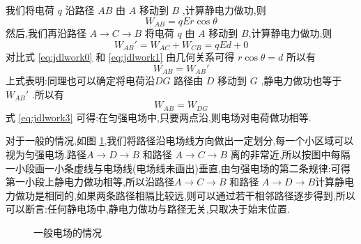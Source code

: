   我们将电荷 $q$ 沿路径 $AB$ 由 $A$ 移动到 $B$ ,计算静电力做功,则
  \begin{equation}
    W_{AB}=qEr\cos\theta
    \label{eq:jdlwork0}
  \end{equation}
  然后,我们再沿路径 $A\to C\to B$ 将电荷 $q$ 由 $A$ 移动到 $B$,计算静电力做功,则
  \begin{equation}
    W_{AB}'=W_{AC}+W_{CB}=qEd+0
    \label{eq:jdlwork1}
  \end{equation}
  对比式 \eqref{eq:jdlwork0} 和 \eqref{eq:jdlwork1} 由几何关系可得 $r\cos\theta  =d$ 所以有
  \begin{equation}
    W_{AB}=W_{AB}'
    \label{eq:jdlwork2}
  \end{equation}
  上式表明:同理也可以确定将电荷沿$DG$ 路径由 $D$ 移动到 $G$ ,静电力做功也等于$W_{AB}'$ .所以有
  \begin{equation}
    W_{AB}=W_{DG}
    \label{eq:jdlwork3}
  \end{equation}
  式 \eqref{eq:jdlwork3} 可得:在匀强电场中,只要两点沿,则电场对电荷做功相等.

  对于一般的情况,如图 \ref{fig:yibanjdlwork},我们将路径沿电场线方向做出一定划分,每一个小区域可以视为匀强电场.路径$A\to D\to B$ 和路径 $A\to C\to B$ 离的非常近,所以按图中每隔一小段画一小条虚线与电场线(电场线未画出)垂直,由匀强电场的第二条规律:可得第一小段上静电力做功相等,所以沿路径$A\to C\to B$ 和路径 $A\to D\to B$计算静电力做功是相同的,如果两条路径相隔比较远,则可以通过若干相邻路径逐步得到,所以可以断言:任何静电场中,静电力做功与路径无关,只取决于始末位置.


  \begin{figure}[H]
    \centering
    \caption{一般电场的情况}
    \label{fig:yibanjdlwork}
  \end{figure}

